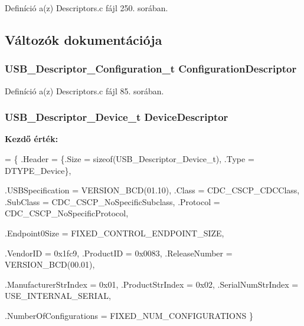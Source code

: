 Definíció a(z) Descriptors.\-c fájl 250. sorában.



\subsection{Változók dokumentációja}
\subsubsection[{Configuration\-Descriptor}]{\setlength{\rightskip}{0pt plus 5cm}U\-S\-B\-\_\-\-Descriptor\-\_\-\-Configuration\-\_\-t Configuration\-Descriptor}\label{_descriptors_8c_a2d091eefbfaf5bd43f4cf77d140e2d9f}


Definíció a(z) Descriptors.\-c fájl 85. sorában.

\subsubsection[{Device\-Descriptor}]{\setlength{\rightskip}{0pt plus 5cm}U\-S\-B\-\_\-\-Descriptor\-\_\-\-Device\-\_\-t Device\-Descriptor}\label{_descriptors_8c_a6a373a28a14fd420dd82bdd0f6978544}
{\bfseries Kezdő érték\-:}
\begin{DoxyCode}
= \{
    .Header                 = \{.Size = \textcolor{keyword}{sizeof}(USB\_Descriptor\_Device\_t), .Type = DTYPE\_Device\},

    .USBSpecification       = VERSION\_BCD(01.10),
    .Class                  = CDC\_CSCP\_CDCClass,
    .SubClass               = CDC\_CSCP\_NoSpecificSubclass,
    .Protocol               = CDC\_CSCP\_NoSpecificProtocol,

    .Endpoint0Size          = FIXED\_CONTROL\_ENDPOINT\_SIZE,

    .VendorID               = 0x1fc9,   
    .ProductID              = 0x0083,   
    .ReleaseNumber          = VERSION\_BCD(00.01),

    .ManufacturerStrIndex   = 0x01,
    .ProductStrIndex        = 0x02,
    .SerialNumStrIndex      = USE\_INTERNAL\_SERIAL,

    .NumberOfConfigurations = FIXED\_NUM\_CONFIGURATIONS
\}
\end{DoxyCode}


